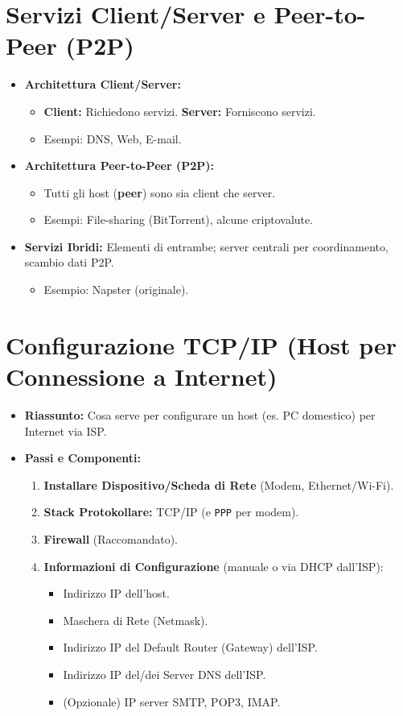 \section{Servizi Client/Server e Peer-to-Peer (P2P)}
\begin{itemize}
    \item \textbf{Architettura Client/Server:}
    \begin{itemize}
        \item \textbf{Client:} Richiedono servizi. \textbf{Server:} Forniscono servizi.
        \item Esempi: DNS, Web, E-mail.
    \end{itemize}
    \item \textbf{Architettura Peer-to-Peer (P2P):}
    \begin{itemize}
        \item Tutti gli host (\textbf{peer}) sono sia client che server.
        \item Esempi: File-sharing (BitTorrent), alcune criptovalute.
    \end{itemize}
    \item \textbf{Servizi Ibridi:} Elementi di entrambe; server centrali per coordinamento, scambio dati P2P.
    \begin{itemize}
        \item Esempio: Napster (originale).
    \end{itemize}
\end{itemize}

\section{Configurazione TCP/IP (Host per Connessione a Internet)}
\begin{itemize}
    \item \textbf{Riassunto:} Cosa serve per configurare un host (es. PC domestico) per Internet via ISP.
    \item \textbf{Passi e Componenti:}
    \begin{enumerate}
        \item \textbf{Installare Dispositivo/Scheda di Rete} (Modem, Ethernet/Wi-Fi).
        \item \textbf{Stack Protokollare:} TCP/IP (e \texttt{PPP} per modem).
        \item \textbf{Firewall} (Raccomandato).
        \item \textbf{Informazioni di Configurazione} (manuale o via DHCP dall'ISP):
        \begin{itemize}
            \item Indirizzo IP dell'host.
            \item Maschera di Rete (Netmask).
            \item Indirizzo IP del Default Router (Gateway) dell'ISP.
            \item Indirizzo IP del/dei Server DNS dell'ISP.
            \item (Opzionale) IP server SMTP, POP3, IMAP.
        \end{itemize}
    \end{enumerate}
\end{itemize}

